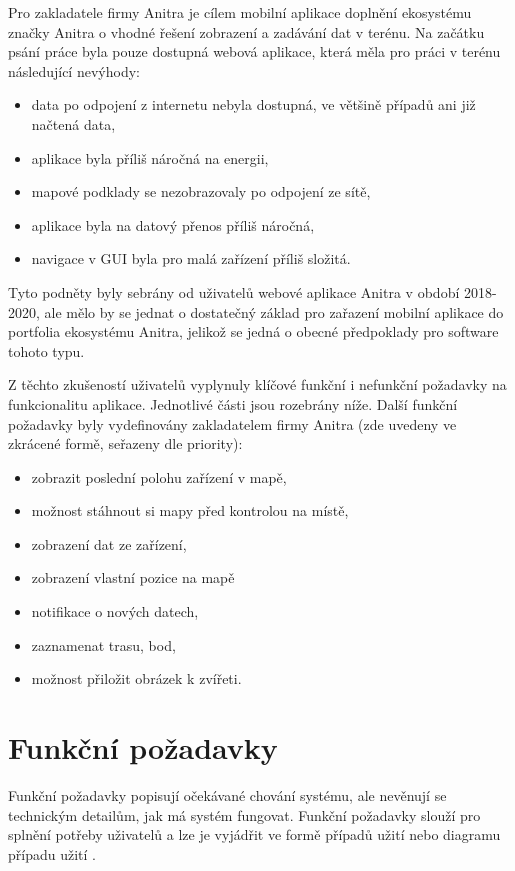 Pro zakladatele firmy Anitra je cílem mobilní aplikace doplnění ekosystému značky Anitra o vhodné řešení zobrazení a zadávání dat v terénu. Na začátku psání práce byla pouze dostupná webová aplikace, která měla pro práci v terénu následující nevýhody:

\begin{itemize}
	\item data po odpojení z internetu nebyla dostupná, ve většině případů ani již načtená data,
	\item aplikace byla příliš náročná na energii,
	\item mapové podklady se nezobrazovaly po odpojení ze sítě,
	\item aplikace byla na datový přenos příliš náročná,
	\item navigace v GUI byla pro malá zařízení příliš složitá.
\end{itemize}

Tyto podněty byly sebrány od uživatelů webové aplikace Anitra v období 2018-2020, ale mělo by se jednat o dostatečný základ pro zařazení mobilní aplikace do portfolia ekosystému Anitra, jelikož se jedná o obecné předpoklady pro software tohoto typu.

Z těchto zkušeností uživatelů vyplynuly klíčové funkční i nefunkční požadavky na funkcionalitu aplikace. Jednotlivé části jsou rozebrány níže. Další funkční požadavky byly vydefinovány zakladatelem firmy Anitra (zde uvedeny ve zkrácené formě, seřazeny dle priority):

\begin{itemize}
	\item zobrazit poslední polohu zařízení v mapě,
	\item možnost stáhnout si mapy před kontrolou na místě,
	\item zobrazení dat ze zařízení,
	\item zobrazení vlastní pozice na mapě
	\item notifikace o nových datech,
	\item zaznamenat trasu, bod,
	\item možnost přiložit obrázek k zvířeti.
\end{itemize}

\section{Funkční požadavky}

Funkční požadavky popisují očekávané chování systému, ale nevěnují se technickým detailům, jak má systém fungovat. Funkční požadavky slouží pro splnění potřeby uživatelů a lze je vyjádřit ve formě případů užití nebo diagramu případu užití \cite{jacobson1987object}.


